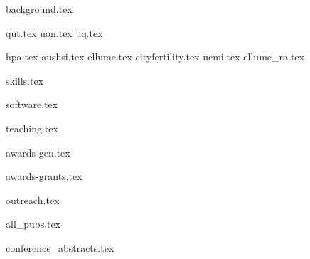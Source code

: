 \documentclass[11pt]{article}
\begin{document}
{background.tex}

{qut.tex}
{uon.tex}
{uq.tex}

\vspace{1mm}
{hpa.tex}
{aushsi.tex}
{ellume.tex}
{cityfertility.tex}
{ucmi.tex}
{ellume_ra.tex}

\vspace{1mm}
{skills.tex}

\vspace{1mm}
{software.tex}

\vspace{1mm}
{teaching.tex}

\vspace{1mm}
{awards-gen.tex}

\vspace{1mm}
{awards-grants.tex}

\vspace{1mm}
{outreach.tex}

\vspace{1mm}
\begin{enumerate}
	{all_pubs.tex}
\end{enumerate}\par

\vspace{1mm}
{conference_abstracts.tex}
\end{document}
